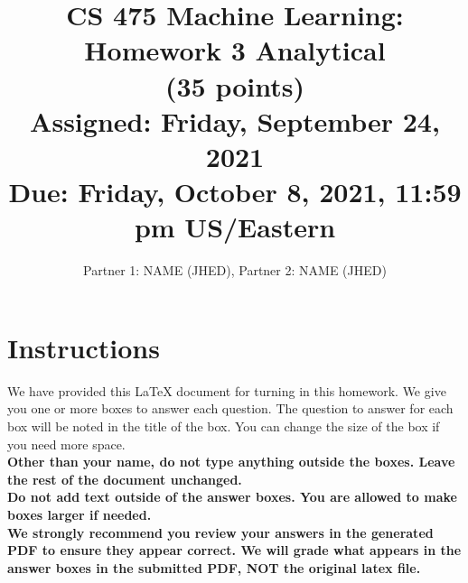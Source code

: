\documentclass[11pt]{article}
\title{CS 475 Machine Learning: Homework 3 Analytical \\
(35 points)\\
\Large{Assigned: Friday, September 24, 2021} \\
\Large{Due: Friday, October 8, 2021, 11:59 pm US/Eastern}}
\author{Partner 1: NAME (JHED), Partner 2:  NAME (JHED)}
\date{}
\renewcommand{\vec}[1]{\mathbf{#1}}
\begin{document}
\maketitle
\thispagestyle{headings}

\section*{Instructions }
We have provided this \LaTeX{} document for turning in this homework. We give you one or more boxes to answer each question.  The question to answer for each box will be noted in the title of the box.  You can change the size of the box if you need more space.\\

{\bf Other than your name, do not type anything outside the boxes. Leave the rest of the document unchanged.}\\


\textbf{
  Do
  not add text outside of the answer boxes.  You are allowed to make boxes larger if needed.
  }\\


\textbf{We strongly recommend you review your answers in the generated PDF to
  ensure they appear correct. We will grade what appears in the answer boxes in
  the submitted PDF, NOT the original latex file.}

\end{document}

